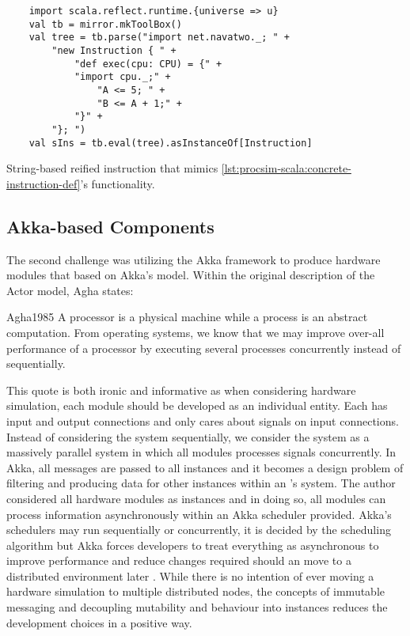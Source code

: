 \begin{listing}[hb!]
    \begin{verbatim}
    import scala.reflect.runtime.{universe => u}
    val tb = mirror.mkToolBox()
    val tree = tb.parse("import net.navatwo._; " +
        "new Instruction { " +
            "def exec(cpu: CPU) = {" +
            "import cpu._;" +
                "A <= 5; " +
                "B <= A + 1;" +
            "}" +
        "}; ")
    val sIns = tb.eval(tree).asInstanceOf[Instruction]
    \end{verbatim}
    \caption{String-based reified instruction that mimics \cref{lst:procsim-scala:concrete-instruction-def}'s functionality.}
    \label{lst:procsim-scala:reify-instruction-def}
\end{listing}

\subsection{Akka-based Components}

The second challenge was utilizing the Akka framework to produce hardware modules that based on Akka's \akkaActor{} model. Within the original description of the Actor model, Agha states:
\begin{displaycquote}{Agha1985}
    A processor is a physical machine while a process is an abstract computation. From operating systems, we know that we may improve over-all performance of a processor by executing several processes concurrently instead of sequentially.
\end{displaycquote}
This quote is both ironic and informative as when considering hardware simulation, each module should be developed as an individual entity. Each has input and output connections and only cares about signals on input connections. Instead of considering the system sequentially, we consider the system as a massively parallel system in which all modules processes signals concurrently. In Akka, all messages are passed to all \akkaActor{} instances and it becomes a design problem of filtering and producing data for other \akkaActor{} instances within an \akkaActor's system. The author considered all hardware modules as \akkaActor{} instances and in doing so, all modules can process information asynchronously within an Akka scheduler provided. Akka's schedulers may run sequentially or concurrently, it is decided by the scheduling algorithm but Akka forces developers to treat everything as asynchronous to improve performance and reduce changes required should an \akkaActor{} move to a distributed environment later \cite{TypesafeAkka2015}. While there is no intention of ever moving a hardware simulation to multiple distributed nodes, the concepts of immutable messaging and decoupling mutability and behaviour into \akkaActor{} instances reduces the development choices in a positive way. 

